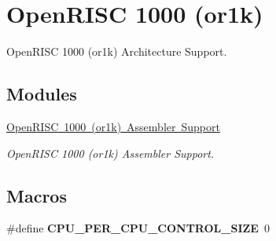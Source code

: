 \hypertarget{group__RTEMSScoreCPUor1k}{}\section{Open\+R\+I\+SC 1000 (or1k)}
\label{group__RTEMSScoreCPUor1k}


Open\+R\+I\+SC 1000 (or1k) Architecture Support.  


\subsection*{Modules}
\begin{DoxyCompactItemize}
\item 
\mbox{\hyperlink{group__RTEMSScoreCPUor1kASM}{Open\+R\+I\+S\+C 1000 (or1k) Assembler Support}}
\begin{DoxyCompactList}\small\item\em Open\+R\+I\+SC 1000 (or1k) Assembler Support. \end{DoxyCompactList}\end{DoxyCompactItemize}
\subsection*{Macros}
\begin{DoxyCompactItemize}
\item 
\mbox{\label{group__RTEMSScoreCPUor1k_gaf8e38596ad3db49995fd8eb9fb4e86b2}} 
\#define {\bfseries C\+P\+U\+\_\+\+P\+E\+R\+\_\+\+C\+P\+U\+\_\+\+C\+O\+N\+T\+R\+O\+L\+\_\+\+S\+I\+ZE}~0
\end{DoxyCompactItemize}
